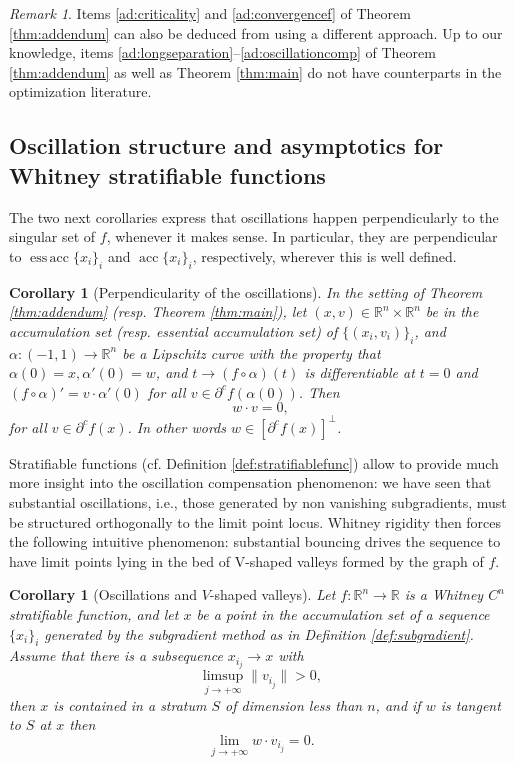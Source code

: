 \documentclass[11pt]{article}
\newtheorem{coro}[thm]{Corollary}
\theoremstyle{definition}
\theoremstyle{remark}
\newtheorem{rmk}[thm]{Remark}
\DeclareMathOperator{\acc}{acc}
\DeclareMathOperator{\essacc}{ess\,acc}
\newcommand{\R}{\mathbb{R}}
\begin{document}
\begin{rmk}
 Items \ref{ad:criticality} and \ref{ad:convergencef} of Theorem \ref{thm:addendum} can also be deduced from \cite[Proposition 3.27]{BHS} using a different approach. Up to our knowledge, items \ref{ad:longseparation}--\ref{ad:oscillationcomp} of Theorem \ref{thm:addendum} as well as Theorem \ref{thm:main} do not have counterparts in the optimization literature. %
\end{rmk}


%
%
%
%
%

%
\subsection{Oscillation structure and asymptotics for Whitney stratifiable functions} 
\label{sec:whitney}

The two next corollaries express that oscillations happen perpendicularly to the singular set of $f$,  whenever it makes sense. In particular, they are perpendicular to  $\essacc\{x_i\}_i$ and $\acc\{x_i\}_i$, respectively, wherever this is well defined. 
%


\begin{coro}[Perpendicularity of the oscillations]\label{cor:perp}
 In the setting of Theorem \ref{thm:addendum} (resp. Theorem \ref{thm:main}), let $(x,v)\in\R^n\times\R^n$ be in the accumulation set (resp. essential accumulation set) of $\{(x_i,v_i)\}_i$, and
 $\alpha\colon (-1,1)\to\R^n$ be a Lipschitz curve with the property that $\alpha(0)=x,\alpha'(0)=w$, and $t\to (f\circ \alpha)(t)$ is differentiable at $t=0$ and $(f\circ\alpha)'=v\cdot\alpha'(0)$ for all $v\in\partial^cf(\alpha(0))$. Then 
 \[w\cdot v=0,\] for all $v\in\partial^c f(x)$. In other words $w\in \left[\partial^c f(x)\right]^{\perp}$. 
\end{coro}

Stratifiable functions (cf. Definition \ref{def:stratifiablefunc}) allow to provide much more insight into  the oscillation compensation phenomenon:  we have seen that substantial oscillations, i.e., those generated by non vanishing subgradients, must be structured orthogonally to the limit point locus. Whitney rigidity then forces the following intuitive phenomenon: substantial bouncing drives the sequence to have limit points lying in the bed of V-shaped valleys formed by the graph of $f$.  

\begin{coro}[Oscillations and $V$-shaped valleys]\label{cor:whitney}
 Let $f\colon\R^n\to\R$ is a Whitney $C^{n}$ stratifiable function, and let $x$ be a point in the accumulation set of a sequence $\{x_i\}_i$ generated by the subgradient method as in Definition \ref{def:subgradient}. Assume that there is a subsequence $x_{i_j}\to x$ with
 \[\limsup_{j\to+\infty}\|v_{i_j}\|>0, \]
 then $x$ is contained in a stratum $S$ of dimension less than $n$, and if $w$ is tangent to $S$ at $x$ then
 \[\lim_{j\to+\infty}w\cdot v_{i_j}=0.\]
\end{coro}
\end{document}
